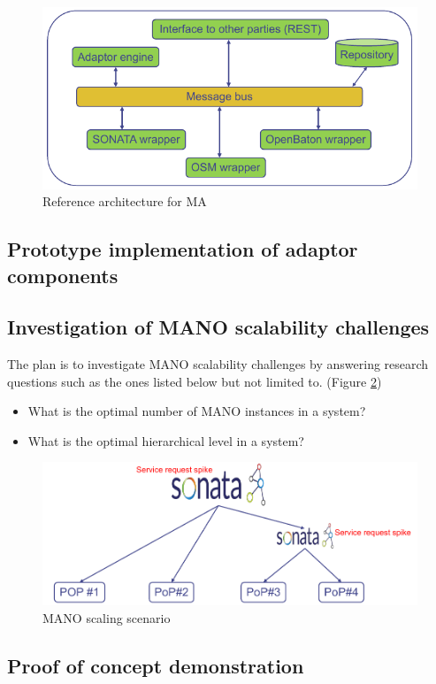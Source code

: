 \begin{figure}[h]
	\centering
	\includegraphics[width=0.9\linewidth]{figures/wp3Arch}
	\caption{Reference architecture for MA}
	\label{fig:wp3arch}
\end{figure}

\subsection{Prototype implementation of adaptor components}

\subsection{Investigation of MANO scalability challenges}
\label{wp3manoresearch}
The plan is to investigate MANO scalability challenges by answering research questions such as the ones listed below but not limited to. (Figure \ref{fig:wp3manoscale})
\begin{itemize}
	\item What is the optimal number of MANO instances in a system?
	\item What is the optimal hierarchical level in a system?
\end{itemize}

\begin{figure}[h]
	\centering
	\includegraphics[width=0.9\linewidth]{figures/wp3manoScale}
	\caption{MANO scaling scenario}
	\label{fig:wp3manoscale}
\end{figure}



\subsection{Proof of concept demonstration}
